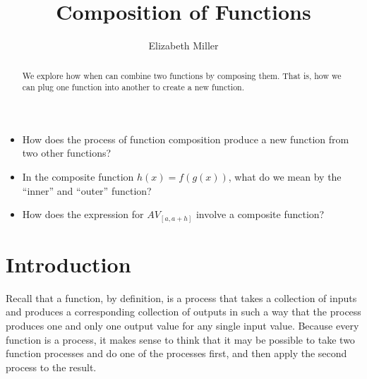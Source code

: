 \documentclass{ximera}
\author{Elizabeth Miller}
\title{Composition of Functions}
\begin{document}
\begin{abstract}
  We explore how when can combine two functions by composing them.  That is, how we can plug one function into another to create a new function.
\end{abstract}
\maketitle



\begin{motivatingQuestions}\begin{itemize}
\item How does the process of function composition produce a new function from two other functions?
\item In the composite function \(h(x) = f(g(x))\), what do we mean by the ``inner'' and ``outer'' function?  
\item How does the expression for \(AV_{[a,a+h]}\) involve a composite function?
\end{itemize}\end{motivatingQuestions}



\section{Introduction}
Recall that a function, by definition, is a process that takes a collection of inputs and produces a corresponding collection of outputs in such a way that the process produces one and only one output value for any single input value.  Because every function is a process, it makes sense to think that it may be possible to take two function processes and do one of the processes first, and then apply the second process to the result.
\end{document}
